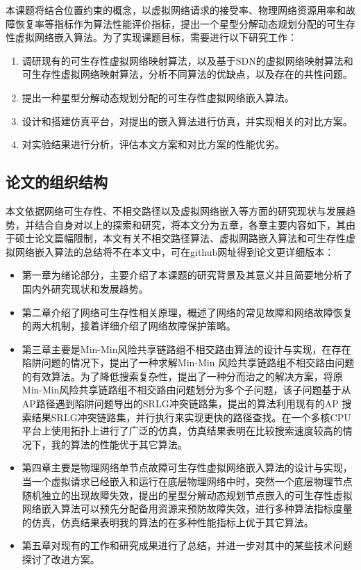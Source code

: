 本课题将结合位置约束的概念，以虚拟网络请求的接受率、物理网络资源用率和故障恢复率等指标作为算法性能评价指标，提出一个星型分解动态规划分配的可生存性虚拟网络嵌入算法。为了实现课题目标，需要进行以下研究工作：
\begin{enumerate}
  \item 调研现有的可生存性虚拟网络映射算法，以及基于SDN的虚拟网络映射算法和可生存性虚拟网络映射算法，分析不同算法的优缺点，以及存在的共性问题。
  \item 提出一种星型分解动态规划分配的可生存性虚拟网络嵌入算法。
  \item 设计和搭建仿真平台，对提出的嵌入算法进行仿真，并实现相关的对比方案。
  \item 对实验结果进行分析，评估本文方案和对比方案的性能优劣。
\end{enumerate}

\subsection{论文的组织结构}
本文依据网络可生存性、不相交路径以及虚拟网络嵌入等方面的研究现状与发展趋势，并结合自身对以上的探索和研究，将本文分为五章，各章主要内容如下，其由于硕士论文篇幅限制，本文有关不相交路径算法、虚拟网路嵌入算法和可生存性虚拟网络嵌入算法的总结将不在本文中，可在github网址\cite{Thesis}得到论文更详细版本：
\begin{itemize}
  \item 第一章为绪论部分，主要介绍了本课题的研究背景及其意义并且简要地分析了国内外研究现状和发展趋势。
  \item 第二章介绍了网络可生存性相关原理，概述了网络的常见故障和网络故障恢复的两大机制，接着详细介绍了网络故障保护策略。
  \item 第三章主要是Min-Min风险共享链路组不相交路由算法的设计与实现，在存在陷阱问题的情况下，提出了一种求解Min-Min 风险共享链路组不相交路由问题的有效算法。为了降低搜索复杂性，提出了一种分而治之的解决方案，将原Min-Min风险共享链路组不相交路由问题划分为多个子问题，该子问题基于从AP路径遇到陷阱问题导出的SRLG冲突链路集，提出的算法利用现有的AP 搜索结果SRLG冲突链路集，并行执行来实现更快的路径查找。在一个多核CPU 平台上使用拓扑上进行了广泛的仿真，仿真结果表明在比较搜索速度较高的情况下，我的算法的性能优于其它算法。
  \item 第四章主要是物理网络单节点故障可生存性虚拟网络嵌入算法的设计与实现，当一个虚拟请求已经嵌入和运行在底层物理网络中时，突然一个底层物理节点随机独立的出现故障失效，提出的星型分解动态规划节点嵌入的可生存性虚拟网络嵌入算法可以预先分配备用资源来预防故障失效，进行多种算法指标度量的仿真，仿真结果表明我的算法的在多种性能指标上优于其它算法。
  \item 第五章对现有的工作和研究成果进行了总结，并进一步对其中的某些技术问题探讨了改进方案。
\end{itemize}
